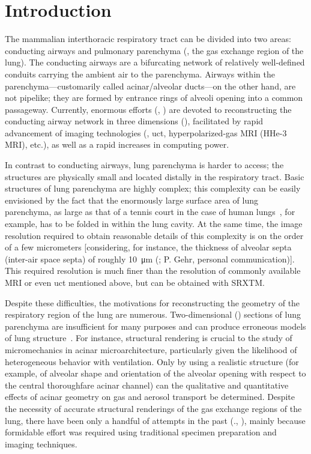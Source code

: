 \section{Introduction}
The mammalian interthoracic respiratory tract can be divided into two areas: conducting airways and pulmonary parenchyma (\ie, the gas exchange region of the lung). The conducting airways are a bifurcating network of relatively well-defined conduits carrying the ambient air to the parenchyma. Airways within the parenchyma---customarily	called	acinar/alveolar ducts---on the other hand, are not pipelike; they are formed by entrance rings of alveoli opening into a common passageway. Currently, enormous efforts (\eg, \cite{Aykac2003,Chaturvedi2005,Cheng2007,Chooi2004,Dame2006,Driehuys2007,Kvistedal2005,Ley2008,Scadeng2007,Sera2003,Tawhai2004,VanErtbruggen2005}) are devoted to reconstructing the conducting airway network in three dimensions (\threed), facilitated by rapid advancement of imaging technologies (\eg, \ac{uct}, hyperpolarized-gas \ac{MRI} (HHe-3 \ac{MRI}), etc.), as well as a rapid increases in computing power.

In contrast to conducting airways, lung parenchyma is harder to access; the structures are physically small and located distally in the respiratory tract. Basic structures of lung parenchyma are highly complex; this complexity can be easily envisioned by the fact that the enormously large surface area of lung parenchyma, as large as that of a tennis court in the case of human lungs~\cite{Gehr1978,Weibel1963}, for example, has to be folded in within the lung cavity. At the same time, the image resolution required to obtain reasonable details of this complexity is on the order of a few micrometers [considering, for instance, the thickness of alveolar septa (inter-air space septa) of roughly \SI{10}{\micro\meter} (\cite{Gehr1978}; P. Gehr, personal communication)]. This required resolution is much finer than the resolution of commonly available \ac{MRI} or even \ac{uct} mentioned above, but can be obtained with \ac{SRXTM}.

Despite these difficulties, the motivations for reconstructing the \threed geometry of the respiratory region of the lung are numerous. Two-dimensional (\twod) sections of lung parenchyma are insufficient for many purposes and can produce erroneous models of lung structure~\cite{Cookson1993}. For instance, \threed structural rendering is crucial to the study of micromechanics in \threed acinar microarchitecture, particularly given the likelihood of heterogeneous behavior with ventilation. Only by using a realistic \threed structure (for example, of alveolar shape and orientation of the alveolar opening with respect to the central thoroughfare acinar channel) can the qualitative and quantitative effects of \threed acinar geometry on gas and aerosol transport be determined. Despite the necessity of accurate \threed structural renderings of the gas exchange regions of the lung, there have been only a handful of attempts in the past (\eg., \cite{Berend1991,Cookson1993,Honda2002,Litzlbauer2006,Mercer1987,Mercer1987a,Randell1989,Stelter1966,Watz2005}), mainly because formidable effort was required using traditional specimen preparation and imaging techniques.

